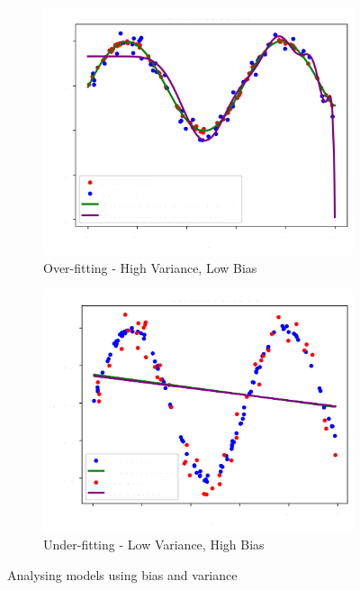 \documentclass{report}
\begin{document}
\begin{figure}[H]
  \centering
  \begin{subfigure}{.4\textwidth}
    \centering
    \includegraphics[width=\linewidth]{images/14.png}
    \caption{Over-fitting - High Variance, Low Bias}
  \end{subfigure}%
  \begin{subfigure}{.4\textwidth}
    \centering
    \includegraphics[width=\linewidth]{images/15.png}
    \caption{Under-fitting - Low Variance, High Bias}
  \end{subfigure}
  \caption{Analysing models using bias and variance}
\end{figure}
\end{document}
